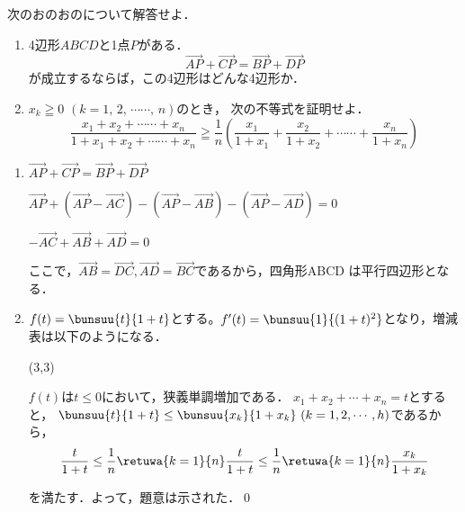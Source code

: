 \begin{problem}
次のおのおのについて解答せよ．
\begin{enumerate}
\item 4辺形$ABCD$と1点$P$がある．
\[ \Vec{AP}+\Vec{CP}=\Vec{BP}+\Vec{DP} \]
が成立するならば，この4辺形はどんな4辺形か．
\item $x_k\geqq0$ $(k=1, \, 2, \, \cdots\cdots, \, n)$のとき，
次の不等式を証明せよ．
\[ \frac{x_1+x_2+\cdots\cdots+x_n}{1+x_1+x_2+\cdots\cdots+x_n} \geqq
\frac{1}{n}\left( \frac{x_1}{1+x_1}+\frac{x_2}{1+x_2}+\cdots\cdots+\frac{x_n}{1+x_n} \right) \]
\end{enumerate}
\end{problem}

\noindent\kaie
\begin{enumerate}
  \item $\Vec{AP} + \Vec{CP} = \Vec{BP} + \Vec{DP}$

  $\Vec{AP} + (\Vec{AP} - \Vec{AC}) - (\Vec{AP}- \Vec{AB}) - (\Vec{AP} - \Vec{AD}) = 0$

  $-\Vec{AC} + \Vec{AB} + \Vec{AD} = 0$

  ここで，$\Vec{AB} = \Vec{DC}, \Vec{AD} = \Vec{BC}$であるから，四角形ABCD
  は平行四辺形となる．

  \item $f(t) = \bunsuu{t}{1+t}$とする。$f'(t) = \bunsuu{1}{(1+t)^2}$となり，増減表は以下のようになる．

  \RESETKEYA
  \zogen(3,3)

  $f(t)$は$t\leq 0$において，狭義単調増加である．
  $x_1 + x_2 + \cdots + x_n = t$とすると，
  $\bunsuu{t}{1+t} \leq \bunsuu{x_k}{1+x_k}\ (k = 1,2,\cdots,h)$であるから，
  \[\frac{t}{1+t} \leq \frac{1}{n}\retuwa{k=1}{n}\frac{t}{1+t} \leq \frac{1}{n}\retuwa{k=1}{n}\frac{x_k}{1+x_k}\]

  を満たす．よって，題意は示された．\qed
\end{enumerate}
